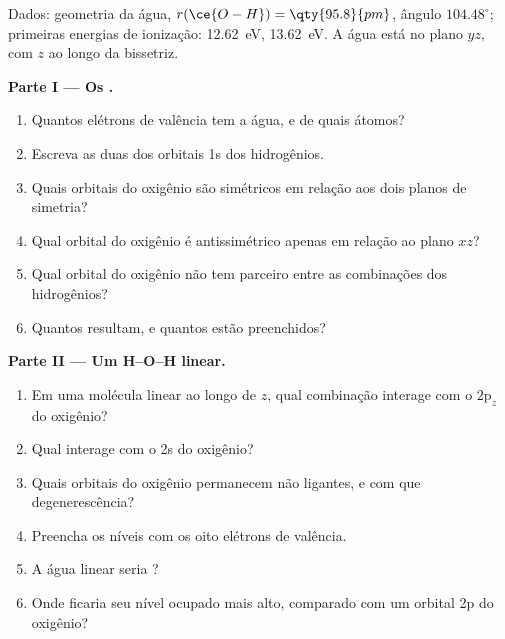 \begin{problem}
\label{pb:b2:fragment-orbitals:1}
Dados: geometria da água, $r(\ce{O-H}) = \qty{95.8}{pm}$, ângulo
$104.48^\circ$; primeiras energias de ionização:  \qty{12.62}{eV}, 
\qty{13.62}{eV}. A água está no plano $yz$, com $z$ ao longo da bissetriz.

\medskip
\noindent\textbf{Parte I --- Os .}
\begin{enumerate}
  \item Quantos elétrons de valência tem a água, e de quais átomos?
  \item Escreva as duas  dos orbitais 1s dos hidrogênios.
  \item Quais orbitais do oxigênio são simétricos em relação aos dois planos de simetria?
  \item Qual orbital do oxigênio é antissimétrico apenas em relação ao plano $xz$?
  \item Qual orbital do oxigênio não tem parceiro entre as combinações dos hidrogênios?
  \item Quantos  resultam, e quantos estão preenchidos?
\end{enumerate}

\medskip
\noindent\textbf{Parte II --- Um H--O--H linear.}
\begin{enumerate}[resume]
  \item Em uma molécula linear ao longo de $z$, qual combinação interage com o
        $2\mathrm p_z$ do oxigênio?
  \item Qual interage com o 2s do oxigênio?
  \item Quais orbitais do oxigênio permanecem não ligantes, e com que degenerescência?
  \item Preencha os níveis com os oito elétrons de valência.
  \item A água linear seria ?
  \item Onde ficaria seu nível ocupado mais alto, comparado com um orbital 2p
        do oxigênio?
\end{enumerate}


\end{problem}
